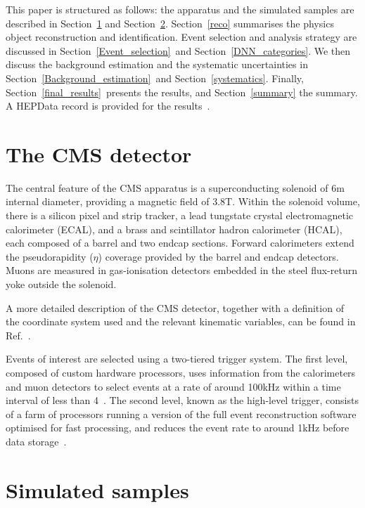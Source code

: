 This paper is structured as follows: the apparatus and the simulated samples are described in Section~\ref{detector_reco} and Section~\ref{Simulated_samples}. Section~\ref{reco} summarises
the physics object reconstruction and identification. Event selection and analysis strategy are discussed in Section~\ref{Event_selection}~and Section~\ref{DNN_categories}. We then discuss the background estimation and the systematic uncertainties
in Section~\ref{Background_estimation}~and Section~\ref{systematics}. Finally, Section~\ref{final_results}~presents the results, and Section~\ref{summary} the summary. A HEPData record is provided for the results~\cite{hepdata}.

\section{The CMS detector}
\label{detector_reco}

The central feature of the CMS apparatus is a superconducting solenoid of 6\unit{m} internal diameter, providing a magnetic field of 3.8\unit{T}. Within the solenoid volume, there is a silicon pixel and strip tracker, a lead tungstate crystal electromagnetic calorimeter (ECAL), and a brass and scintillator hadron calorimeter (HCAL), each composed of a barrel and two endcap sections. Forward calorimeters extend the pseudorapidity ($\eta$) coverage provided by the barrel and endcap detectors. Muons are measured in gas-ionisation detectors embedded in the steel flux-return yoke outside the solenoid.

A more detailed description of the CMS detector, together with a definition of the coordinate system used and the relevant kinematic variables, can be found in Ref.~\cite{Chatrchyan:2008zzk}.

Events of interest are selected using a two-tiered trigger system.
The first level, composed of custom hardware processors, uses information from the calorimeters and muon detectors to select events at a rate of around 100\unit{kHz} within a time interval of less than 4\mus~\cite{CMS:2020cmk}.
The second level, known as the high-level trigger, consists of a farm of processors running a version of the full event reconstruction software optimised for fast processing, and reduces the event rate to around 1\unit{kHz} before data storage~\cite{Khachatryan_2017}.
\section{Simulated samples}\label{Simulated_samples}

